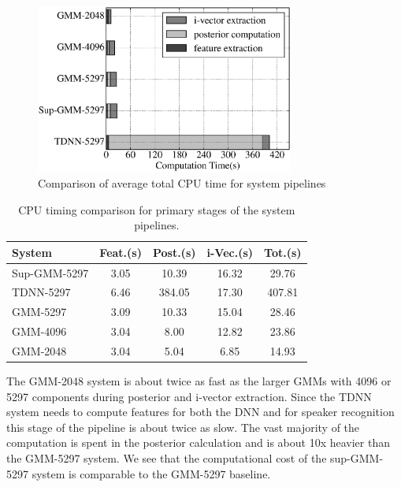 \documentclass{article}
\begin{document}
\begin{figure}[t]
\centerline{\includegraphics[width=8.5cm]{fig/time}}
\caption{Comparison of average total CPU time for system pipelines}
\label{fig:time}
\end{figure}


\begin{table}
\caption{CPU timing comparison for primary stages of the system pipelines.}
\begin{center}
\begin{tabular}{l|cccc}
\hline
System & Feat.(s) & Post.(s) & i-Vec.(s) & Tot.(s) \\ \hline \hline
Sup-GMM-5297 & 3.05 & 10.39 & 16.32 & 29.76 \\
TDNN-5297 & 6.46 & 384.05 & 17.30 & 407.81 \\
GMM-5297 & 3.09  & 10.33 & 15.04 & 28.46 \\
GMM-4096 & 3.04 & 8.00 & 12.82 & 23.86 \\
GMM-2048 & 3.04 & 5.04 & 6.85 & 14.93 \\ \hline
\end{tabular}
\end{center}
\label{timing}
\end{table}

The GMM-2048 system is about twice as fast as the
larger GMMs with 4096 or 5297 components during posterior and i-vector
extraction. Since the TDNN system needs to compute features for both the
DNN and for speaker recognition this stage of the pipeline is about twice
as slow. The vast majority of the computation is spent in
the posterior calculation and is about 10x heavier than the GMM-5297 system.
We see that the computational cost of the sup-GMM-5297 system is comparable
to the GMM-5297 baseline.
\end{document}

